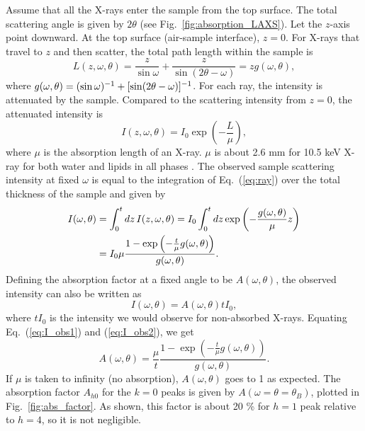 Assume that all the X-rays enter the sample from the top surface. The total scattering
angle is given by $2\theta$ (see Fig.~\ref{fig:absorption_LAXS}).
Let the $z$-axis point downward. At the top surface
(air-sample interface), $z=0$. For X-rays that travel to $z$ and then scatter, the
total path length within the sample is 
\begin{equation}
  L(z,\omega,\theta) 
  = \frac{z}{\sin\omega}+\frac{z}{\sin(2\theta-\omega)} 
  = zg(\omega,\theta),
\end{equation}
where $g(\omega,\theta)=(\sin\omega)^{-1}+\mathopen{}\left[ \sin\mathopen{}\left( 2\theta-\omega \right)\mathclose{} \right]\mathclose{}^{-1}$.
For each ray, the intensity is attenuated by the sample. 
Compared to the scattering intensity from $z=0$, the attenuated intensity is
\begin{equation}
  I(z,\omega,\theta) = I_0\exp\left(-\frac{L}{\mu}\right),
  \label{eq:ray}
\end{equation}
where $\mu$ is the absorption length of an X-ray. $\mu$ is about 2.6 mm for 
10.5 keV X-ray
for both water and lipids in all phases \cite{ref:cxro}.
The observed sample scattering intensity at fixed $\omega$ 
is equal to the integration
of Eq.~(\ref{eq:ray}) over the total thickness of the sample and given by
\begin{align}
  I(\omega,\theta) 
    &= \int_0^t \mathop{dz} I(z,\omega,\theta)
     = I_0\int_0^t\mathop{dz} \exp\left(-\frac{g(\omega,\theta)}{\mu}z\right) \nonumber \\
    &= I_0\mu \frac{1-\exp\left(-\frac{t}{\mu}g(\omega,\theta)\right)}{g(\omega,\theta)}.
    \label{eq:I_obs1}
\end{align}
Defining the absorption factor at a fixed angle to be $A(\omega,\theta)$, 
the observed intensity can also be written as
\begin{equation}
  I(\omega,\theta)=A(\omega,\theta)tI_0,
  \label{eq:I_obs2}
\end{equation}
where $tI_0$ is the intensity we would observe for non-absorbed X-rays.
Equating Eq.~(\ref{eq:I_obs1}) and (\ref{eq:I_obs2}), we get
\begin{equation}
  A(\omega,\theta) = \frac{\mu}{t} 
                     \frac{1-\exp\left(-\frac{t}{\mu}g(\omega,\theta)\right)}{g(\omega,\theta)}.
  \label{eq:ang_abs_factor}
\end{equation}
If $\mu$ is taken to infinity (no absorption), $A(\omega,\theta)$ 
goes to 1 as expected.
The absorption factor $A_{h0}$ for the $k=0$ peaks is given by
$A(\omega=\theta=\theta_B)$, plotted in Fig.~\ref{fig:abs_factor}.
As shown, this factor is about 20 \% for $h=1$ peak relative to
$h=4$, so it is not negligible.

